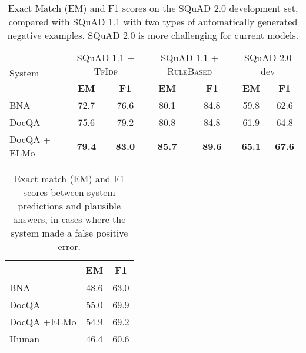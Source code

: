 \documentclass{article}
\begin{document}
\begin{table}[h]
    \centering
    \begin{tabular}{| l | c c | c c | c c |}
         \hline
         \multirow{2}{3cm}{System} & \multicolumn{2}{c|}{SQuAD 1.1 + \textsc{Tf}\textsc{Idf}}
         & \multicolumn{2}{c|}{SQuAD 1.1 + \textsc{Rule}\textsc{Based}} & \multicolumn{2}{c|}{SQuAD 2.0 dev}\\
          & \textbf{EM} & \textbf{F1}
         & \textbf{EM} & \textbf{F1} & \textbf{EM}
         & \textbf{F1}\\
         \hline
         BNA & 72.7 & 76.6 & 80.1 & 84.8 & 59.8 & 62.6\\
         DocQA & 75.6 & 79.2 & 80.8 & 84.8 & 61.9 & 64.8\\
         DocQA + ELMo & \textbf{79.4} & \textbf{83.0} & \textbf{85.7} & \textbf{89.6} & \textbf{65.1} & \textbf{67.6}\\
         \hline
    \end{tabular}
    \caption{Exact Match (EM) and F1 scores on the SQuAD 2.0 development set, compared with SQuAD 1.1 with
    two types of automatically generated negative examples. SQuAD 2.0 is more challenging for current models.}
    \label{tab:table_4}
\end{table}

\begin{table}[h]
    \centering
    \begin{tabular}{| l | c c |}
         \hline
         \textbf{} & \textbf{EM} & \textbf{F1}\\
         \hline
         BNA & 48.6 & 63.0\\
         DocQA & 55.0 & 69.9\\
         DocQA +ELMo & 54.9 & 69.2\\
         \hline
         Human & 46.4 & 60.6\\
         \hline
    \end{tabular}
    \caption{Exact match (EM) and F1 scores between system predictions and plausible answers, in cases where the system made a false positive error.}
    \label{tab:table_5}
\end{table}
\end{document}
